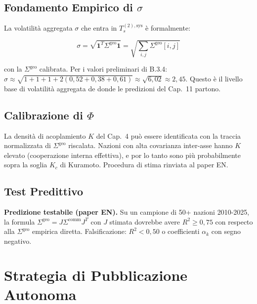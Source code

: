 \subsection{\texorpdfstring{Fondamento Empirico di
\(\sigma\)}{Fondamento Empirico di \textbackslash sigma}}\label{fondamento-empirico-di-sigma}

La volatilità aggregata \(\sigma\) che entra in \(T_s^{(2),\text{sys}}\)
è formalmente:

\[
\sigma = \sqrt{\boldsymbol{1}^T \Sigma^{\text{geo}} \boldsymbol{1}} = \sqrt{\sum_{i,j} \Sigma^{\text{geo}}[i,j]}
\]

con la \(\Sigma^{\text{geo}}\) calibrata. Per i valori preliminari di
B.3.4:
\(\hat\sigma \approx \sqrt{1+1+1+2(0{,}52+0{,}38+0{,}61)} \approx \sqrt{6{,}02} \approx 2{,}45\).
Questo è il livello base di volatilità aggregata de donde le predizioni
del Cap.~11 partono.

\subsection{\texorpdfstring{Calibrazione di
\(\Phi\)}{Calibrazione di \textbackslash Phi}}\label{calibrazione-di-phi}

\Hypoth{} La densità di acoplamiento \(K\) del Cap.~4 può essere
identificata con la traccia normalizzata di \(\Sigma^{\text{geo}}\)
riscalata. Nazioni con alta covarianza inter-asse hanno \(K\) elevato
(cooperazione interna effettiva), e por lo tanto sono più probabilmente sopra
la soglia \(K_c\) di Kuramoto. Procedura di stima rinviata al paper EN.

\subsection{Test Predittivo}\label{test-predittivo}

\Conj{} \textbf{Predizione testabile (paper EN).} Su un campione di 50+
nazioni 2010-2025, la formula
\(\Sigma^{\text{geo}} = J \Sigma^{\text{comm}} J^T\) con \(J\) stimata
dovrebbe avere \(R^2 \geq 0{,}75\) con respecto alla \(\Sigma^{\text{geo}}\)
empirica diretta. Falsificazione: \(R^2 < 0{,}50\) o coefficienti
\(\alpha_k\) con segno negativo.



\section{Strategia di Pubblicazione
Autonoma}\label{strategia-di-pubblicazione-autonoma}

